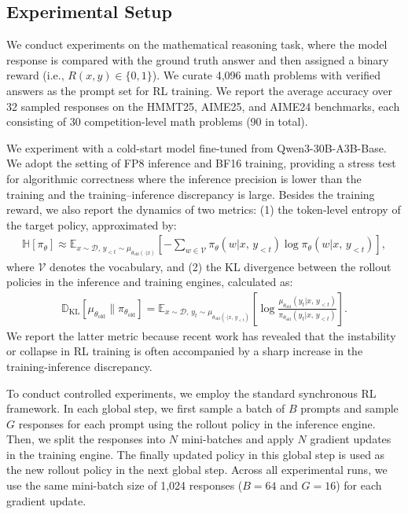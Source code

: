 \documentclass{article}
\begin{document}
\subsection{Experimental Setup}

We conduct experiments on the mathematical reasoning task, where the model response is compared with the ground truth answer and then assigned a binary reward (i.e., \( R(x, y) \in \{0, 1\} \)).
We curate 4,096 math problems with verified answers as the prompt set for RL training.
We report the average accuracy over 32 sampled responses on the HMMT25, AIME25, and AIME24 benchmarks, each consisting of 30 competition-level math problems (90 in total).

We experiment with a cold-start model fine-tuned from Qwen3-30B-A3B-Base.
We adopt the setting of FP8 inference and BF16 training, providing a stress test for algorithmic correctness where the inference precision is lower than the training and the training–inference discrepancy is large.
Besides the training reward, we also report the dynamics of two metrics:
(1) the token-level entropy of the target policy, approximated by: 
\begin{align*}
\mathbb{H} \left[ \pi_\theta \right] 
\approx  
\mathbb{E}_{ x \sim \mathcal{D}, \, y_{<t} \sim \mu_{ \theta_\text{old} (\cdot | x) } } \left[ - \sum_{w \in \mathcal{V} } \pi_\theta ( w | x,\, y_{<t}) \log \pi_\theta ( w | x,\, y_{<t})
\right],
\end{align*}
where \( \mathcal{V} \) denotes the vocabulary,
and (2) the KL divergence between the rollout policies in the inference and training engines, calculated as: 
\begin{align*}
\mathbb{D}_\text{KL} 
\left[ \mu_{ \theta_\text{old} } \| \pi_{ \theta_\text{old} } \right] 
=
\mathbb{E}_{ x \sim \mathcal{D}, \, y_t \sim \mu_{ \theta_\text{old} (\cdot | x,\, y_{<t}) } } \left[ \log 
\frac{ \mu_{ \theta_\text{old} } ( y_t | x,\, y_{<t} ) }{ \pi_{ \theta_\text{old} } ( y_t | x,\, y_{<t} ) } 
\right].
\end{align*}
We report the latter metric because recent work \citep{yao2025offpolicy,liu-li-2025-rl-collapse} has revealed that the instability or collapse in RL training is often accompanied by a sharp increase in the training-inference discrepancy.

To conduct controlled experiments, we employ the standard synchronous RL framework.
In each global step, we first sample a batch of \(B\) prompts and sample \(G\) responses for each prompt using the rollout policy in the inference engine.
Then, we split the responses into \(N\) mini-batches and apply \(N\) gradient updates in the training engine.
The finally updated policy in this global step is used as the new rollout policy in the next global step.
Across all experimental runs, we use the same mini-batch size of 1,024 responses (\( B=64 \) and \( G=16 \)) for each gradient update.
\end{document}
